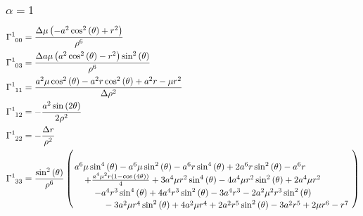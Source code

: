 \documentclass[11pt,a4paper]{article}
\begin{document}
\subsubsection*{$\alpha= 1$}
\begin{align} 
	\Gamma^1_{\phantom{1} 0 0} &=\frac{\Delta \mu \left(- a^{2} \cos^{2}{\left(\theta \right)} + r^{2}\right)}{\rho^{6}}\\
	\Gamma^1_{\phantom{1} 0 3} &=\frac{\Delta a \mu \left(a^{2} \cos^{2}{\left(\theta \right)} - r^{2}\right) \sin^{2}{\left(\theta \right)}}{\rho^{6}}\\
	\Gamma^1_{\phantom{1} 1 1} &=\frac{a^{2} \mu \cos^{2}{\left(\theta \right)} - a^{2} r \cos^{2}{\left(\theta \right)} + a^{2} r - \mu r^{2}}{\Delta \rho^{2}}\\
	\Gamma^1_{\phantom{1} 1 2} &=- \frac{a^{2} \sin{\left(2 \theta \right)}}{2 \rho^{2}}\\
	\Gamma^1_{\phantom{1} 2 2} &=- \frac{\Delta r}{\rho^{2}}\\
	\Gamma^1_{\phantom{1} 3 3} &= \frac{\sin^{2}{\left(\theta \right)}}{\rho^{6}}
	\left(\splitfrac{a^{6} \mu \sin^{4}{\left(\theta \right)} - a^{6} \mu \sin^{2}{\left(\theta \right)} - a^{6} r \sin^{4}{\left(\theta \right)} + 2 a^{6} r \sin^{2}{\left(\theta \right)} - a^{6} r }{\splitdfrac{+ \frac{a^{4} \mu^{2} r \left(1 - \cos{\left(4 \theta \right)}\right)}{4} + 3 a^{4} \mu r^{2} \sin^{4}{\left(\theta \right)} - 4 a^{4} \mu r^{2} \sin^{2}{\left(\theta \right)} + 2 a^{4} \mu r^{2}  }{\splitdfrac{- a^{4} r^{3} \sin^{4}{\left(\theta \right)} + 4 a^{4} r^{3} \sin^{2}{\left(\theta \right)}- 3 a^{4} r^{3}-2 a^{2} \mu^{2} r^{3} \sin^{2}{\left(\theta \right)} }{- 3 a^{2} \mu r^{4} \sin^{2}{\left(\theta \right)} + 4 a^{2} \mu r^{4} + 2 a^{2} r^{5} \sin^{2}{\left(\theta \right)} - 3 a^{2} r^{5} + 2 \mu r^{6} - r^{7}} }} \right) \\
\end{align}
\end{document}
